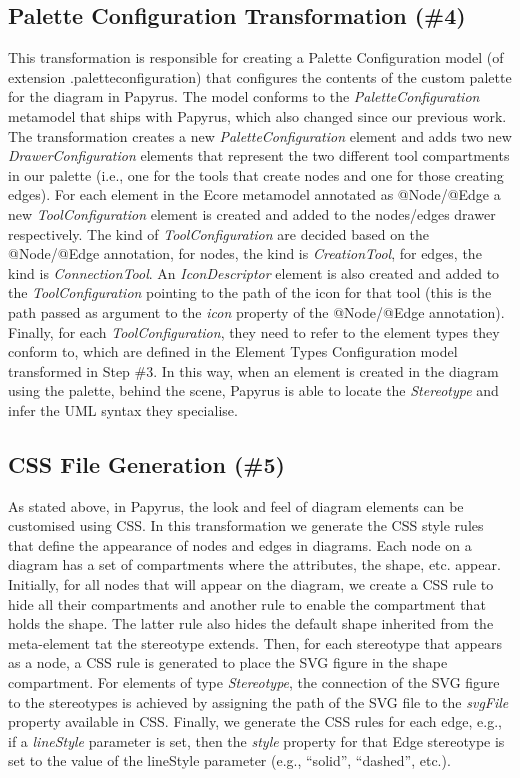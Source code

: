 \subsection{Palette Configuration Transformation (\#4)}
\label{sec:paletteGeneration}
This transformation is responsible for creating a Palette Configuration model (of extension .paletteconfiguration) that configures the contents of the custom palette for the diagram in Papyrus. 
The model conforms to the \textit{PaletteConfiguration} metamodel that ships with Papyrus, which also changed since our previous work. 
The transformation creates a new \textit{PaletteConfiguration} element and adds two new \textit{DrawerConfiguration} elements that represent the two different tool compartments in our palette (i.e., one for the tools that create nodes and one for those creating edges). 
For each element in the Ecore metamodel annotated as @Node/@Edge a new \textit{ToolConfiguration} element is created and added to the nodes/edges drawer respectively. 
The kind of \textit{ToolConfiguration} are decided based on the @Node/@Edge annotation, for nodes, the kind is \textit{CreationTool}, for edges, the kind is \textit{ConnectionTool}.
An \textit{IconDescriptor} element is also created and added to the \textit{ToolConfiguration} pointing to the path of the icon for that tool (this is the path passed as argument to the \textit{icon} property of the @Node/@Edge annotation).
Finally, for each \textit{ToolConfiguration}, they need to refer to the element types they conform to, which are defined in the Element Types Configuration model transformed in Step \#3. 
In this way, when an element is created in the diagram using the palette, behind the scene, Papyrus is able to locate the \textit{Stereotype} and infer the UML syntax they specialise.

\subsection{CSS File Generation (\#5)}
\label{sec:cssGeneration}
As stated above, in Papyrus, the look and feel of diagram elements can be customised using CSS. 
In this transformation we generate the CSS style rules that define the appearance of nodes and edges in diagrams. 
Each node on a diagram has a set of compartments where the attributes, the shape, etc. appear. 
Initially, for all nodes that will appear on the diagram, we create a CSS rule to hide all their compartments and another rule to enable the compartment that holds the shape. 
The latter rule also hides the default shape inherited from the meta-element tat the stereotype extends. 
Then, for each stereotype that appears as a node, a CSS rule is generated to place the SVG figure in the shape compartment. 
For elements of type \textit{Stereotype}, the connection of the SVG figure to the stereotypes is achieved by assigning the path of the SVG file to the \textit{svgFile} property available in CSS. 
Finally, we generate the CSS rules for each edge, e.g., if a \emph{lineStyle} parameter is set, then the \textit{style} property for that Edge stereotype is set to the value of the lineStyle parameter (e.g., ``solid'', ``dashed'', etc.).

